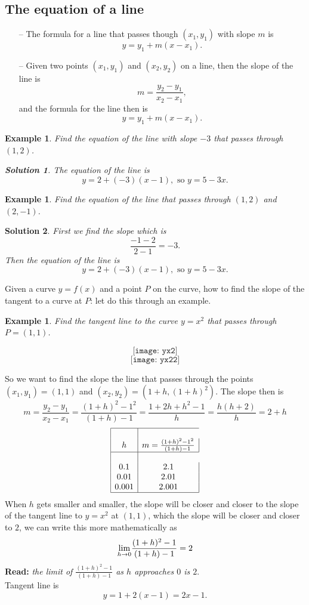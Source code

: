 \documentclass[12pt,a4paper]{book}
\newtheorem{Example}[theorem]{Example}
\numberwithin{equation}{section}
\newtheorem*{solution}{{\bf Solution}}
\begin{document}
\subsection*{The equation of a line}
\begin{itemize}
\item[--] The formula for a line that passes though $(x_1,y_1)$ with slope $m$ is 
$$ y=y_1+m(x-x_1).$$
\item[--] Given two points $(x_1,y_1)$ and $(x_2,y_2)$ on a line, then the slope of the line is $$m=\frac{y_2-y_1}{x_2-x_1},$$
and the formula for the line then is 
$$ y=y_1+m(x-x_1).$$
\end{itemize}
	\begin{Example} 
Find the equation of the line with slope $-3$ that passes through $(1,2)$. 
\begin{solution}
	The equation of the line is $$y=2+(-3)(x-1), \text{~so~}y=5-3x.$$	
\end{solution}		
		\end{Example} 
\begin{Example}
	Find the equation of the line that passes through $(1,2)$ and $(2,-1)$.
\end{Example}
\begin{solution}
	First we find the slope which is 
	$$\frac{-1-2}{2-1}=-3.$$ Then the equation of the line is 
$$y=2+(-3)(x-1), \text{~so~}y=5-3x.$$	
\end{solution}




 Given a curve $y=f(x)$ and a point $P$ on the curve, how to find the slope of the tangent to a curve at $P$:  let do this through an example.

\begin{Example}
	Find the tangent line to the curve $y=x^2$ that passes through $P=(1,1)$.
\end{Example}
$$
\texttt{[image: yx2]}
$$
$$
\texttt{[image: yx22]}
$$

So we want to find the slope the line that passes through the points $(x_1,y_1)=(1,1)$ and $(x_2,y_2)=(1+h,(1+h)^2)$. The slope then is 
$$
m=\frac{y_2-y_1}{x_2-x_1}=\frac{ (1+h)^2-1^2 }{(1+h)-1}=\frac{1+2h+h^2-1}{h}=\frac{h(h+2)}{h}=2+h
$$
$$
\begin{array}{|c|c|}
\hline\\
h & m=\frac{ (1+h)^2-1^2 }{(1+h)-1}\\
\hline\\
0.1 & 2.1\\
0.01 & 2.01\\
0.001 & 2.001\\
\hline
\end{array}
$$
When $h$ gets smaller and smaller, the slope will be closer and closer to the slope of the tangent line to $y=x^2$ at $(1,1)$, which the slope will be closer and closer to $2$, we can write this more mathematically as 
$$ \underset{h\rightarrow 0}{\rm lim} \frac{(1+h)^2-1}{(1+h)-1}=2$$
{\bf Read:}  {\it the limit of $\frac{(1+h)^2-1}{(1+h)-1}$ as $h$ approaches $0$ is $2$}.
\\
Tangent line is
$$y=1+2(x-1)=2x-1.$$
\end{document}
